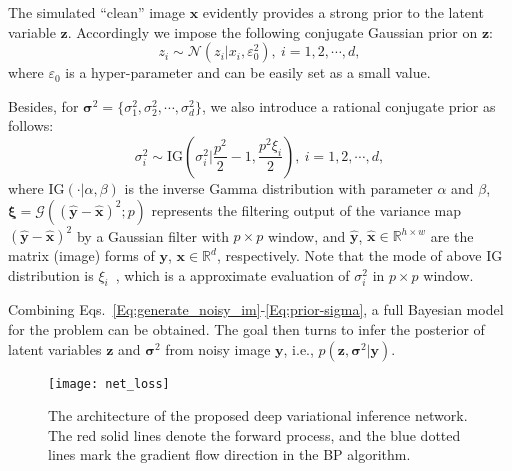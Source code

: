 \documentclass{article}
\begin{document}
The simulated ``clean'' image $\bm{x}$ evidently provides a strong prior to the latent variable $\bm{z}$. Accordingly
we impose the following conjugate Gaussian prior on $\bm{z}$:
\begin{equation}
    z_i \sim \mathcal{N}(z_i|x_i, \varepsilon_0^2), ~i=1,2,\cdots,d,
    \label{Eq:prior-z}
\end{equation}
where $\varepsilon_0$ is a hyper-parameter and can be easily set as a small value.

Besides, for $\bm{\sigma}^2=\{\sigma^2_1, \sigma_2^2, \cdots, \sigma_d^2\}$, we also introduce a rational
conjugate prior as follows:
\begin{equation}
    \sigma_i^2 \sim \text{IG}\left(\sigma_i^2|\frac{p^2}{2}-1, \frac{p^2\xi_i}{2}\right), ~ i=1,2,\cdots, d,
    \label{Eq:prior-sigma}
\end{equation}
where $\text{IG}(\cdot|\alpha, \beta)$ is the inverse Gamma distribution with parameter $\alpha$ and $\beta$,
$\bm{\xi}=\mathcal{G}\left( (\hat{\bm{y}}-\hat{\bm{x}})^2;p \right)$ represents the filtering output of the
variance map $(\hat{\bm{y}}-\hat{\bm{x}})^2$ by a Gaussian filter with $p \times p$ window,
and $\hat{\bm{y}}$, $\hat{\bm{x}} \in \mathbb{R}^{h\times w}$ are the matrix (image) forms of $\bm{y}$,
$\bm{x} \in \mathbb{R}^d$, respectively. Note that the mode of above
IG distribution is $\xi_i$~\cite{bishop2006pattern,yong2017robust}, which is a approximate evaluation of $\sigma_i^2$ in $p \times p$ window.

Combining Eqs.~\eqref{Eq:generate_noisy_im}-\eqref{Eq:prior-sigma}, a full Bayesian model for the problem can be obtained.
The goal then turns to
infer the posterior of latent variables $\bm{z}$ and
$\bm{\sigma}^2$ from noisy image $\bm{y}$, i.e., $p(\bm{z}, \bm{\sigma}^2|\bm{y})$.

\begin{figure}[t]
    \centering
\texttt{[image: net\_loss]}
    \vspace{-3mm}
    \caption{\small{The architecture of the proposed deep variational inference network.
    The red solid lines denote the forward process, and the blue dotted lines mark the gradient
    flow direction in the BP algorithm.}}
    \label{fig:net-loss}\vspace{-4mm}
\end{figure}
\end{document}
